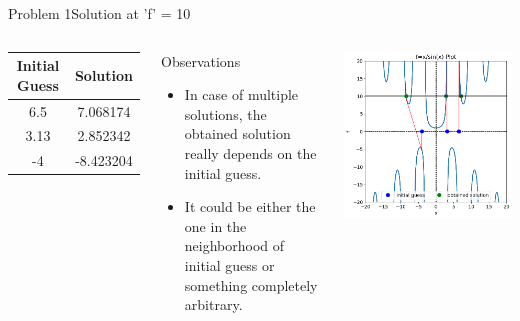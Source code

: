 \documentclass{beamer}
\begin{document}
\begin{frame}{Problem 1}{Solution at 'f' = 10}
    \vspace{-2.5em}
    \begin{columns}
        \begin{table}
            \centering
            \footnotesize
            \begin{tabular}{cc}
                \toprule
                Initial Guess & Solution \\
                \midrule
                6.5     &   7.068174 \\
                3.13    &   2.852342 \\
                -4      &  -8.423204 \\
                \bottomrule
            \end{tabular}
        \end{table}
        \begin{block}{\footnotesize Observations}
            \footnotesize
            \begin{itemize}
                \item In case of multiple solutions, the obtained solution really depends on the initial guess.
                \item It could be either the one in the neighborhood of initial guess or something completely arbitrary.
            \end{itemize}
        \end{block}
        \begin{block}{}
            \includegraphics[width=\textwidth]{Figures/prob1_sol41.png}
        \end{block}
    \end{columns}
\end{frame}
\end{document}
